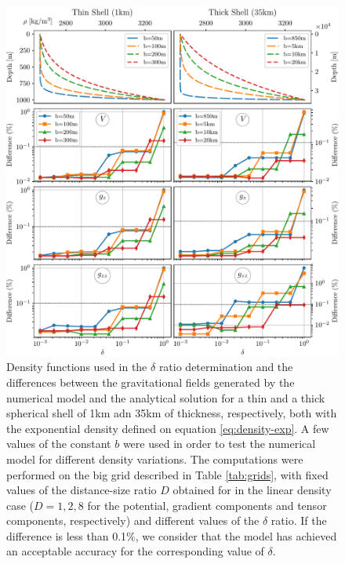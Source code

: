 \documentclass[extra]{gji}
\begin{document}
\begin{figure}
\centering
\includegraphics[width=\linewidth]{figures/exponential-delta.pdf}
\caption{
    Density functions used in the $\delta$ ratio determination and the
    differences between the gravitational fields generated by the
    numerical model and the analytical solution for a thin and a thick
    spherical shell of 1km adn 35km of thickness, respectively, both
    with the exponential density defined on equation
    \ref{eq:density-exp}.
    A few values of the constant $b$ were used in order to test the
    numerical model for different density variations.
    The computations were performed on the big grid described in
    Table \ref{tab:grids}, with fixed values of the distance-size ratio
    $D$ obtained for in the linear density case ($D=1, 2, 8$ for the
    potential, gradient components and tensor components, respectively)
    and different values of the $\delta$ ratio.
    If the difference is less than 0.1\%, we consider that the model
    has achieved an acceptable accuracy for the corresponding value of
    $\delta$.
    }
\label{fig:delta-exponential}
\end{figure}


\end{document}
